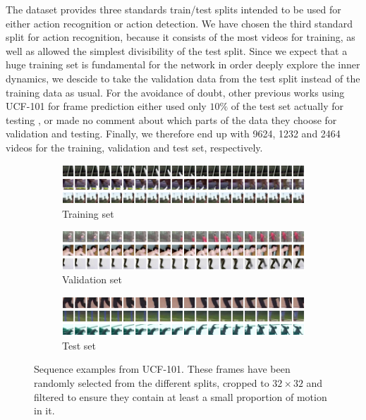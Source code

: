 The dataset provides three standards train/test splits intended to be used for either action recognition or action detection. We have chosen the third standard split for action recognition, because it consists of the most videos for training, as well as allowed the simplest divisibility of the test split. Since we expect that a huge training set is fundamental for the network in order deeply explore the inner dynamics, we descide to take the validation data from the test split instead of the training data as usual. For the avoidance of doubt, other previous works using UCF-101 for frame prediction either used only $ 10\% $ of the test set actually for testing \parencite[p. 12]{deep_multiscale_video_pred}, or made no comment about which parts of the data they choose for validation and testing. Finally, we therefore end up with \num{9624}, \num{1232} and \num{2464} videos for the training, validation and test set, respectively.

\begin{figure}[h!tb]
\centering
\begin{subfigure}{1.0\textwidth}
  \centering
  \includegraphics[width=1.0\linewidth]{figures/ds/ucf_train.png}
  \caption{Training set}
  \label{fig:ucf_train}
  \vspace{.1cm}
\end{subfigure}
\begin{subfigure}{1.0\textwidth}
  \centering
  \includegraphics[width=1.0\linewidth]{figures/ds/ucf_valid.png}
  \caption{Validation set}
  \label{fig:ucf_valid}
  \vspace{.1cm}
\end{subfigure}
\begin{subfigure}{1.0\textwidth}
  \centering
  \includegraphics[width=1.0\linewidth]{figures/ds/ucf_test.png}
  \caption{Test set}
  \label{fig:ucf_test}
\end{subfigure}
\caption[UCF-101 Crop Image Samples]{Sequence examples from UCF-101. These frames have been randomly selected from the different splits, cropped to $32 \times 32 $ and filtered to ensure they contain at least a small proportion of motion in it.}
\label{fig:ucf}
\end{figure}

